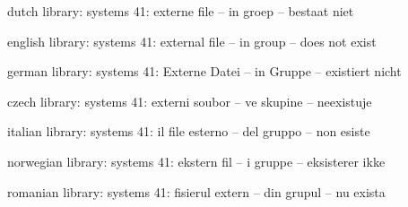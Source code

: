 


\unprotect

\startmessages  dutch  library: systems
     41: externe file -- in groep -- bestaat niet
\stopmessages

\startmessages  english  library: systems
     41: external file -- in group -- does not exist
\stopmessages

\startmessages  german  library: systems
     41: Externe Datei -- in Gruppe -- existiert nicht
\stopmessages

\startmessages  czech  library: systems
     41: externi soubor -- ve skupine -- neexistuje
\stopmessages

\startmessages  italian  library: systems
     41: il file esterno -- del gruppo -- non esiste
\stopmessages

\startmessages  norwegian  library: systems
     41: ekstern fil -- i gruppe -- eksisterer ikke
\stopmessages

\startmessages  romanian  library: systems
     41: fisierul extern -- din grupul -- nu exista
\stopmessages


\setuptabulate
  [\e!legenda]
  [\c!eenheid=.75em,\c!binnen=\setquicktabulate\leg,EQ={=}]



\setuptabulate
  [\e!gegeven]
  [\c!eenheid=.75em,\c!binnen=\setquicktabulate\geg,EQ={=}]

\unexpanded\def\xbox%
  {\bgroup\aftergroup\egroup\hbox\bgroup\tx\let\next=}

\unexpanded\def\xxbox%
  {\bgroup\aftergroup\egroup\hbox\bgroup\txx\let\next=}



